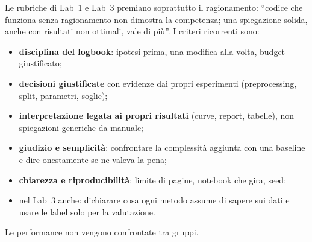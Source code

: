 \begin{esame}
Le rubriche di Lab~1 e Lab~3 premiano soprattutto il ragionamento: ``codice che funziona senza
ragionamento non dimostra la competenza; una spiegazione solida, anche con risultati non ottimali,
vale di più''. I criteri ricorrenti sono:
\begin{itemize}
  \item \textbf{disciplina del logbook}: ipotesi prima, una modifica alla volta, budget giustificato;
  \item \textbf{decisioni giustificate} con evidenze dai propri esperimenti (preprocessing, split,
        parametri, soglie);
  \item \textbf{interpretazione legata ai propri risultati} (curve, report, tabelle), non spiegazioni
        generiche da manuale;
  \item \textbf{giudizio e semplicità}: confrontare la complessità aggiunta con una baseline e dire
        onestamente se ne valeva la pena;
  \item \textbf{chiarezza e riproducibilità}: limite di pagine, notebook che gira, seed;
  \item nel Lab~3 anche: dichiarare cosa ogni metodo assume di sapere sui dati e usare le label
        solo per la valutazione.
\end{itemize}
Le performance non vengono confrontate tra gruppi.
\end{esame}

